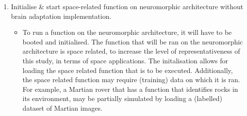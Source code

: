 \begin{enumerate}
    \item Initialise \& start space-related function on neuromorphic architecture without brain adaptation implementation.
    \begin{itemize}
        \item To run a function on the neuromorphic architecture, it will have to be booted and initialised. The function that will be ran on the neuromorphic architecture is space related, to increase the level of representativeness of this study, in terms of space applications. The initalisation allows for loading the space related function that is to be executed. Additionally, the space related function may require (training) data on which it is ran. For example, a Martian rover that has a function that identifies rocks in its environment, may be partially simulated by loading a (labelled) dataset of Martian images.


\end{itemize}
\end{enumerate}
